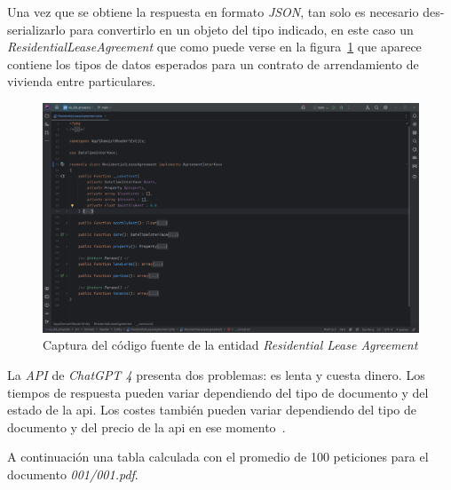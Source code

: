 Una vez que se obtiene la respuesta en formato \textit{JSON}, tan solo es necesario des-serializarlo para convertirlo
en un objeto del tipo indicado, en este caso un \textit{ResidentialLeaseAgreement} que como puede verse en la
figura~\ref{fig:chapter_4.4.residential_agreement} que aparece contiene los tipos de datos esperados para un contrato de
arrendamiento de vivienda entre particulares.

\begin{figure}[ht]
    \begin{center}
        \includegraphics[width=\textwidth]{./chapter/4/images/chapter_4.4.residential_lease_agreement}
        \caption{Captura del código fuente de la entidad \textit{Residential Lease Agreement}}
        \label{fig:chapter_4.4.residential_agreement}
    \end{center}
\end{figure}

La \textit{API} de \textit{ChatGPT 4} presenta dos problemas: es lenta y cuesta dinero.
Los tiempos de respuesta pueden variar dependiendo del tipo de documento y del estado de la api.
Los costes también pueden variar dependiendo del tipo de documento y del precio de la api en ese
momento~\cite{url_openai_api_pricing}.

A continuación una tabla calculada con el promedio de 100 peticiones para el documento \textit{001/001.pdf}.

